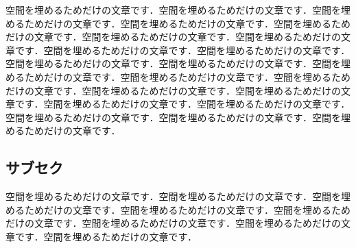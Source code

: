 \documentclass[10pt,a4j,twocolumn]{ltjsarticle}
\begin{document}
空間を埋めるためだけの文章です．空間を埋めるためだけの文章です．空間を埋めるためだけの文章です．空間を埋めるためだけの文章です．空間を埋めるためだけの文章です．空間を埋めるためだけの文章です．空間を埋めるためだけの文章です．空間を埋めるためだけの文章です．空間を埋めるためだけの文章です．空間を埋めるためだけの文章です．空間を埋めるためだけの文章です．空間を埋めるためだけの文章です．空間を埋めるためだけの文章です．空間を埋めるためだけの文章です．空間を埋めるためだけの文章です．空間を埋めるためだけの文章です．空間を埋めるためだけの文章です．空間を埋めるためだけの文章です．空間を埋めるためだけの文章です．空間を埋めるためだけの文章です．空間を埋めるためだけの文章です．

\subsection{サブセク}

空間を埋めるためだけの文章です．空間を埋めるためだけの文章です．空間を埋めるためだけの文章です．空間を埋めるためだけの文章です．空間を埋めるためだけの文章です．空間を埋めるためだけの文章です．空間を埋めるためだけの文章です．空間を埋めるためだけの文章です．
\end{document}

